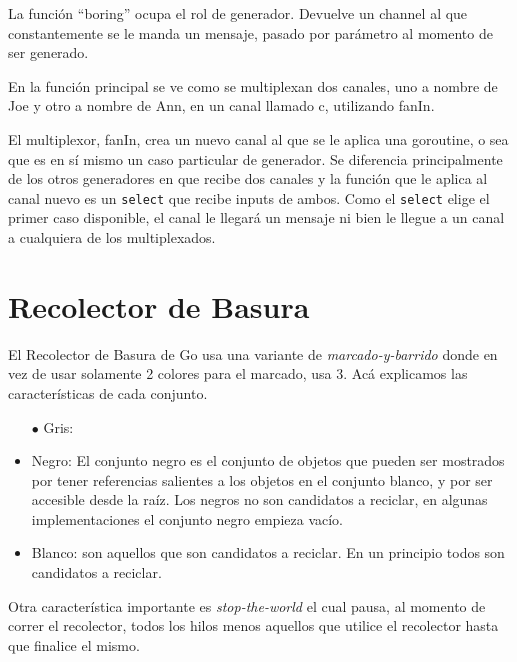 \documentclass{article}
\begin{document}
La función ``boring'' ocupa el rol de generador. Devuelve un channel al que constantemente se le manda un mensaje, pasado por parámetro al momento de ser generado.

En la función principal se ve como se multiplexan dos canales, uno a nombre de Joe y otro a nombre de Ann, en un canal llamado c, utilizando fanIn.

El multiplexor, fanIn, crea un nuevo canal al que se le aplica una goroutine, o sea que es en sí mismo un caso particular de generador. Se diferencia principalmente de los otros generadores en que recibe dos canales y la función que le aplica al canal nuevo es un \lstinline|select| que recibe inputs de ambos. Como el \lstinline|select| elige el primer caso disponible, el canal le llegará un mensaje ni bien le llegue a un canal a cualquiera de los multiplexados.
\section{Recolector de Basura}
El Recolector de Basura de Go usa una variante de \textit{marcado-y-barrido} donde en vez de usar solamente 2 colores para el marcado, usa 3. 
Acá explicamos las características de cada conjunto.
\begin{itemize}
	\item[$\bullet$] Gris:
	\item Negro: El conjunto negro es el conjunto de objetos que pueden ser mostrados por tener referencias salientes a los objetos en el conjunto blanco, y por ser accesible desde la raíz. Los negros no son candidatos a reciclar, en algunas implementaciones el conjunto negro empieza vacío. 
	\item Blanco: son aquellos que son candidatos a reciclar. En un principio todos son candidatos a reciclar. 
\end{itemize}

Otra característica importante es \textit{stop-the-world} el cual pausa, al momento de correr el recolector, todos los hilos menos aquellos que utilice el recolector hasta que finalice el mismo. 
\end{document}
